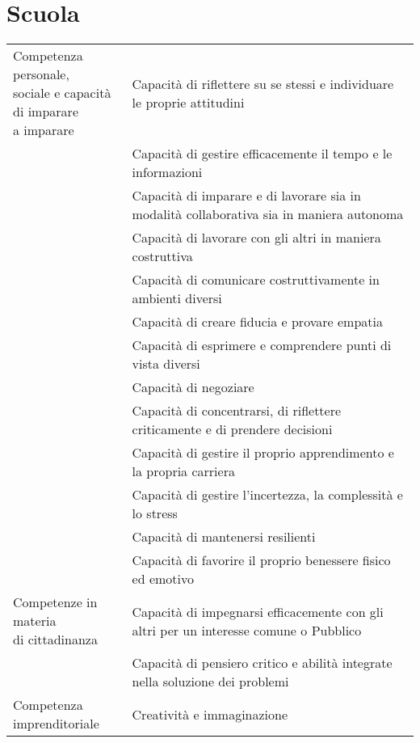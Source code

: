 \section*{Scuola}
\begin{adjustbox}{max width=\textwidth}
\begin{tabular}{m{4cm}p{12.0cm}}
\toprule
\multirowcell{14}{Competenza personale,\\sociale e capacità\\ di imparare\\ a imparare}& Capacità di riflettere su se stessi e individuare le proprie attitudini\\
	&Capacità di gestire efficacemente il tempo e le informazioni  \\
	& Capacità di imparare e di lavorare sia in modalità collaborativa sia in maniera
	autonoma\\
	&  Capacità di lavorare con gli altri in maniera costruttiva\\
	&  Capacità di comunicare costruttivamente in ambienti diversi\\
	&  Capacità di creare fiducia e provare empatia\\
	&  Capacità di esprimere e comprendere punti di vista diversi\\
	&  Capacità di negoziare\\
	&  Capacità di concentrarsi, di riflettere criticamente e di prendere decisioni\\
	&  Capacità di gestire il proprio apprendimento e la propria carriera\\
	&  Capacità di gestire l'incertezza, la complessità e lo stress\\
	&  Capacità di mantenersi resilienti\\
	&  Capacità di favorire il proprio benessere fisico ed emotivo\\
\midrule
\multirowcell{1}{Competenze in materia\\di cittadinanza
}	& Capacità di impegnarsi efficacemente con gli altri per un interesse comune o
Pubblico \\
	& Capacità di pensiero critico e abilità integrate nella soluzione dei problemi \\
\midrule
	\multirowcell{12}{Competenza\\imprenditoriale}& Creatività e immaginazione\\

\end{tabular}
\end{adjustbox}
